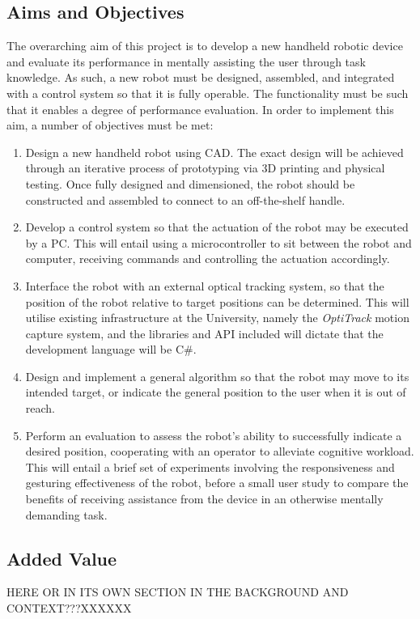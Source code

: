 \documentclass[11pt]{article}
\begin{document}
\subsection{Aims and Objectives}
The overarching aim of this project is to develop a new handheld robotic device and evaluate its performance in mentally assisting the user through task knowledge. As such, a new robot must be designed, assembled, and integrated with a control system so that it is fully operable. The functionality must be such that it enables a degree of performance evaluation. In order to implement this aim, a number of objectives must be met:
\begin{enumerate}
\item{Design a new handheld robot using CAD. The exact design will be achieved through an iterative process of prototyping via 3D printing and physical testing. Once fully designed and dimensioned, the robot should be constructed and assembled to connect to an off-the-shelf handle.}
\item{Develop a control system so that the actuation of the robot may be executed by a PC. This will entail using a microcontroller to sit between the robot and computer, receiving commands and controlling the actuation accordingly.}
\item{Interface the robot with an external optical tracking system, so that the position of the robot relative to target positions can be determined. This will utilise existing infrastructure at the University, namely the \textit{OptiTrack} motion capture system, and the libraries and API included will dictate that the development language will be C\#.}
\item{Design and implement a general algorithm so that the robot may move to its intended target, or indicate the general position to the user when it is out of reach.}
\item{Perform an evaluation to assess the robot's ability to successfully indicate a desired position, cooperating with an operator to alleviate cognitive workload. This will entail a brief set of experiments involving the responsiveness and gesturing effectiveness of the robot, before a small user study to compare the benefits of receiving assistance from the device in an otherwise mentally demanding task.}
\end{enumerate}

\subsection{Added Value}
HERE OR IN ITS OWN SECTION IN THE BACKGROUND AND CONTEXT???XXXXXX
\end{document}
